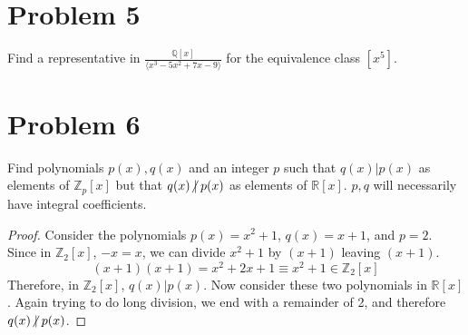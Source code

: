 \documentclass[hidelinks,12pt]{article}
\newcommand{\R}{\mathbb{R}}
\newcommand{\Z}{\mathbb{Z}}
\newcommand{\Q}{\mathbb{Q}}
\begin{document}
\section{Problem 5}Find a representative in $\frac{\Q[x]}{\langle x^3-5x^2+7x-9\rangle}$ for the equivalence class $[x^5]$.\newline{}
\section{Problem 6}Find polynomials $p(x),q(x)$ and an integer $p$ such that $q(x)|p(x)$ as elements of $\Z_p[x]$ but that $q(x)\centernot|p(x)$ as elements of $\R[x]$. $p,q$ will necessarily have integral coefficients.\begin{proof}
Consider the polynomials $p(x)=x^2+1$, $q(x)=x+1$, and $p=2$. Since in $\Z_2[x]$, $-x=x$, we can divide $x^2+1$ by $(x+1)$ leaving $(x+1)$. $$(x+1)(x+1)=x^2+2x+1\equiv x^2+1\in\Z_2[x]$$ Therefore, in $\Z_2[x]$, $q(x)|p(x)$. Now consider these two polynomials in $\R[x]$. Again trying to do long division, we end with a remainder of 2, and therefore $q(x)\centernot|p(x)$.
\end{proof}
\end{document}
